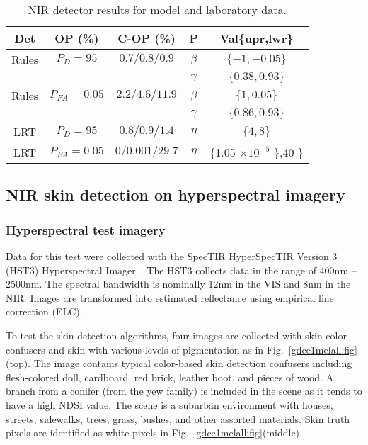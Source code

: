 \documentclass[10pt,journal,cspaper,compsoc]{IEEEtran}
\begin{document}
\begin{table}
\renewcommand{\arraystretch}{1.3}
\caption{NIR detector results for model and laboratory data.} 
\vspace{-0.5cm}
\label{tbl:summary_model}
\begin{center}
\begin{tabular}{|c|c|c|c|c|}
\hline
Det 	 & OP (\%)	      	& C-OP (\%)		& P 		& Val\{upr,lwr\}	\\
\hline
\hline
Rules    & $P_D=95$      	& $0.7/0.8/0.9$		& $\beta$ 	& $\{-1,-0.05\}$ 	\\
	 &			& 			& $\gamma$	& $\{0.38,0.93\}$ 	\\
\hline
Rules    & $P_{FA}=0.05$ 	& $2.2/4.6/11.9$       	& $\beta$ 	& $\{1,0.05\}$ 		\\
	 & 			& 			& $\gamma$	& $\{0.86,0.93\}$ 	\\
\hline
LRT     & $P_D=95$      	& $0.8/0.9/1.4$		& $\eta$	& $\{4,8\}$		\\
\hline
LRT     & $P_{FA}=0.05$ 	& $0/0.001/29.7$	& $\eta$	& \{1.05 \tiny{$\times10^{-5}$ \normalsize{\},40 \} }}	\\
\hline
\end{tabular}
\end{center}
\end{table}

\subsection{NIR skin detection on hyperspectral imagery}
\subsubsection{Hyperspectral test imagery}
Data for this test were collected with the SpecTIR HyperSpecTIR Version 3 (HST3) Hyperspectral Imager~\cite{Jengo1}.  The HST3 collects 
data in the range of 400nm -- 2500nm.  The spectral bandwidth is nominally 12nm in the VIS and 8nm in the NIR. 
Images are transformed into estimated reflectance using empirical line correction (ELC).

To test the skin detection algorithms, four images are collected with skin color confusers and skin with various levels 
of pigmentation as in Fig.~\ref{gdce1melall:fig}(top).  The image contains typical color-based skin detection confusers 
including flesh-colored doll, cardboard, red brick, leather boot, and pieces of wood.  A branch from a conifer 
(from the yew family) is included in the scene as it tends to have a high NDSI value.  The scene is a suburban 
environment with houses, streets, sidewalks, trees, grass, bushes, and other assorted materials.  Skin truth pixels 
are identified as white pixels in Fig.~\ref{gdce1melall:fig}(middle).
\end{document}
